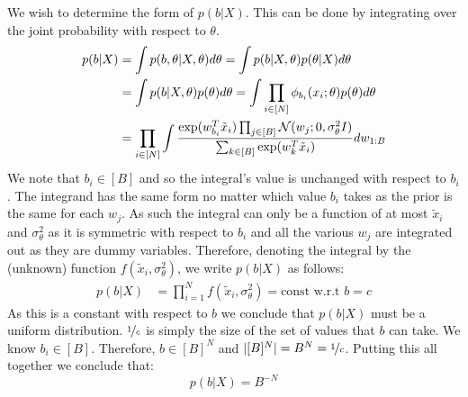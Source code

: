 We wish to determine the form of $p(b| X)$. This can be done by integrating over the joint probability with respect to $\theta$.
%
\begin{align*}
	p(b | X) &= \int p(b , \theta| X, \theta) d\theta = \int p(b | X, \theta) p(\theta | X) d\theta \\
	&=\int p(b | X, \theta) p(\theta) d\theta = \int \prod_{i \in [N] } \phi_{b_i}(x_i; \theta) p(\theta) d\theta \\
	&= \prod_{i \in [N]} \int \frac{\exp(w_{b_i}^T \tilde{x}_i) \prod_{j \in [B]} \mathcal{N}(w_j; 0, \sigma_\theta^2 I)}{\sum_{k \in [B]} \exp(w_{k}^T \tilde{x}_i)} dw_{1:B}
\end{align*}
%
We note that $b_i \in [B]$ and so the integral's value is unchanged with respect to $b_i$. The integrand has the same form no matter which value $b_i$ takes as the prior is the same for each $w_j$. As such the integral can only be a function of at most $\tilde{x}_i$ and $\sigma_\theta^2$ as it is symmetric with respect to $b_i$ and all the various $w_j$ are integrated out as they are dummy variables. Therefore, denoting the integral by the (unknown) function $f(\tilde{x}_i, \sigma_\theta^2)$, we write $p(b| X)$ as follows:
%
\begin{align*}
	p(b | X) &= \prod_{i=1}^{N} f(\tilde{x}_i, \sigma_\theta^2) = \textrm{const w.r.t } b = c
\end{align*}
%
As this is a constant with respect to $b$ we conclude that $p(b | X)$ must be a uniform distribution. $\nicefrac{1}{c}$ is simply the size of the set of values that $b$ can take. We know $b_i \in [B]$. Therefore, $b \in [B]^N$ and $|[B]^N| = B^N = \nicefrac{1}{c}$. Putting this all together we conclude that:
%
\begin{equation}
	p(b | X) = B^{-N}
\end{equation}

